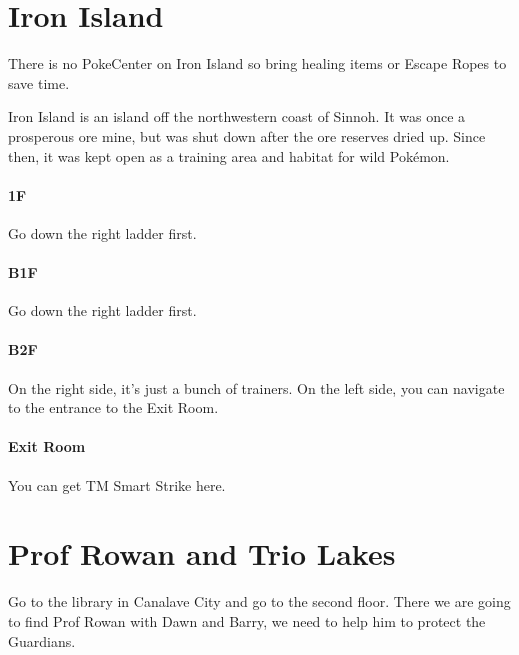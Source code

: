 \documentclass[11pt]{article}
\begin{document}
\section{Iron Island}\label{sec:iron-island}
There is no PokeCenter on Iron Island so bring healing items or Escape Ropes to save time.

Iron Island is an island off the northwestern coast of Sinnoh.
It was once a prosperous ore mine, but was shut down after the ore reserves dried up.
Since then, it was kept open as a training area and habitat for wild Pokémon.

% 

\paragraph{1F}
Go down the right ladder first.



\paragraph{B1F}
Go down the right ladder first.




\paragraph{B2F}
On the right side, it's just a bunch of trainers.
On the left side, you can navigate to the entrance to the Exit Room.




\paragraph{Exit Room}
You can get TM Smart Strike here.



\section{Prof Rowan and Trio Lakes}\label{sec:prof-rowan-and-trio-lakes}
Go to the library in Canalave City and go to the second floor.
There we are going to find Prof Rowan with Dawn and Barry,
we need to help him to protect the Guardians.
\end{document}
